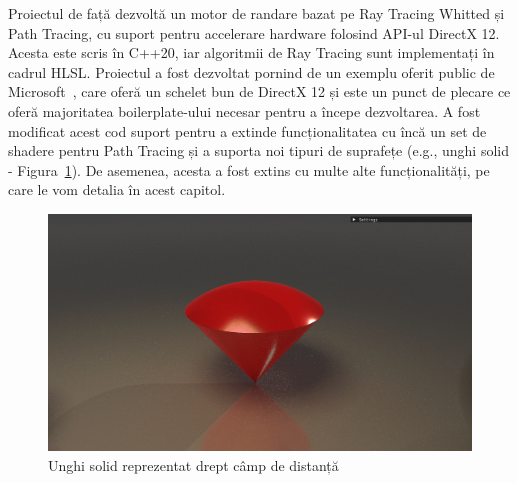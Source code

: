 \documentclass[12pt,a4paper]{report}
\numberwithin{equation}{section} %
\begin{document}
Proiectul de față dezvoltă un motor de randare bazat pe Ray Tracing Whitted și Path Tracing, cu suport
pentru accelerare hardware folosind API-ul DirectX 12. Acesta este scris în C++20,
iar algoritmii de Ray Tracing sunt implementați în cadrul HLSL. Proiectul a fost
dezvoltat pornind de un exemplu oferit public de Microsoft~\cite{Schelet},
care oferă un schelet bun de DirectX 12 și este un punct de plecare ce oferă
majoritatea boilerplate-ului necesar pentru a începe dezvoltarea. A fost modificat acest cod
suport pentru a extinde funcționalitatea cu încă un set de shadere pentru Path Tracing și
a suporta noi tipuri de suprafețe (e.g., unghi solid - Figura~\ref{fig:solid-angle}). De asemenea,
acesta a fost extins cu multe alte funcționalități, pe care le vom detalia în acest
capitol.
\begin{figure}[!htb]
	\centering
	\includegraphics[width=\textwidth]{pics/solid-angle.png}
	\caption{Unghi solid reprezentat drept câmp de distanță\protect\footnotemark}
	\label{fig:solid-angle}
\end{figure}
\end{document}
